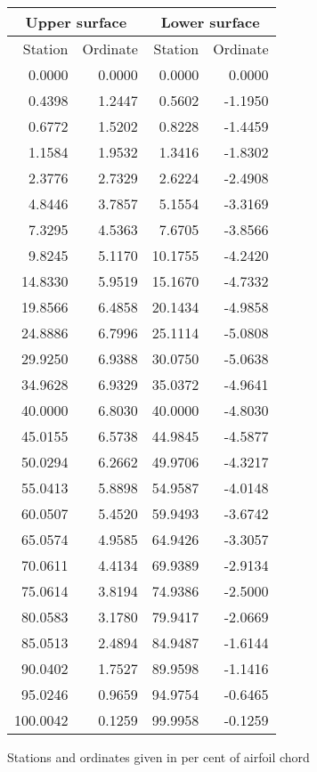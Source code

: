 \documentclass[11pt]{book}
\begin{document}
 \hspace{4mm}
 \begin{tabular}{|r|r|r|r|} \hline 
 \multicolumn{2}{|c|}{Upper surface} & \multicolumn{2}{|c|}{Lower surface} \\
 \hline
 Station & Ordinate & Station & Ordinate \\
 \hline
0.0000 & 0.0000 & 0.0000 & 0.0000 \\
0.4398 & 1.2447 & 0.5602 & -1.1950 \\
0.6772 & 1.5202 & 0.8228 & -1.4459 \\
1.1584 & 1.9532 & 1.3416 & -1.8302 \\
2.3776 & 2.7329 & 2.6224 & -2.4908 \\
4.8446 & 3.7857 & 5.1554 & -3.3169 \\
7.3295 & 4.5363 & 7.6705 & -3.8566 \\
9.8245 & 5.1170 & 10.1755 & -4.2420 \\
14.8330 & 5.9519 & 15.1670 & -4.7332 \\
19.8566 & 6.4858 & 20.1434 & -4.9858 \\
24.8886 & 6.7996 & 25.1114 & -5.0808 \\
29.9250 & 6.9388 & 30.0750 & -5.0638 \\
34.9628 & 6.9329 & 35.0372 & -4.9641 \\
40.0000 & 6.8030 & 40.0000 & -4.8030 \\
45.0155 & 6.5738 & 44.9845 & -4.5877 \\
50.0294 & 6.2662 & 49.9706 & -4.3217 \\
55.0413 & 5.8898 & 54.9587 & -4.0148 \\
60.0507 & 5.4520 & 59.9493 & -3.6742 \\
65.0574 & 4.9585 & 64.9426 & -3.3057 \\
70.0611 & 4.4134 & 69.9389 & -2.9134 \\
75.0614 & 3.8194 & 74.9386 & -2.5000 \\
80.0583 & 3.1780 & 79.9417 & -2.0669 \\
85.0513 & 2.4894 & 84.9487 & -1.6144 \\
90.0402 & 1.7527 & 89.9598 & -1.1416 \\
95.0246 & 0.9659 & 94.9754 & -0.6465 \\
100.0042 & 0.1259 & 99.9958 & -0.1259 \\
 \hline 
 \end{tabular}
 \vspace{8mm}

Stations and ordinates given in per cent of airfoil chord
\end{document}

